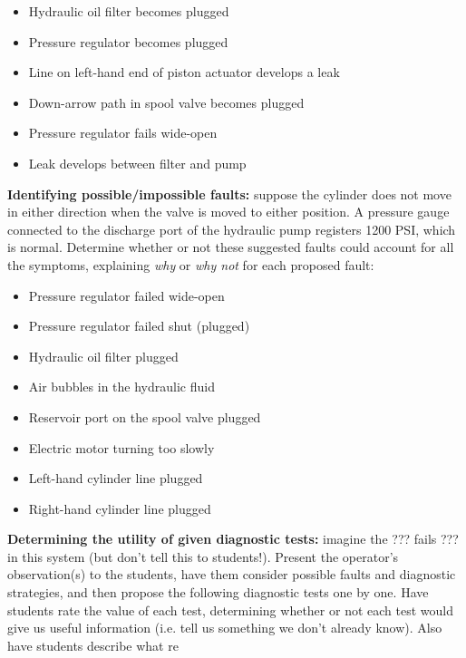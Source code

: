 \begin{itemize}
\item{} Hydraulic oil filter becomes plugged
\item{} Pressure regulator becomes plugged
\item{} Line on left-hand end of piston actuator develops a leak
\item{} Down-arrow path in spool valve becomes plugged
\item{} Pressure regulator fails wide-open
\item{} Leak develops between filter and pump
\end{itemize}


\vskip 10pt


\noindent
{\bf Identifying possible/impossible faults:} suppose the cylinder does not move in either direction when the valve is moved to either position.  A pressure gauge connected to the discharge port of the hydraulic pump registers 1200 PSI, which is normal.  Determine whether or not these suggested faults could account for all the symptoms, explaining {\it why} or {\it why not} for each proposed fault:

\begin{itemize}
\item{} Pressure regulator failed wide-open
\item{} Pressure regulator failed shut (plugged)
\item{} Hydraulic oil filter plugged
\item{} Air bubbles in the hydraulic fluid
\item{} Reservoir port on the spool valve plugged
\item{} Electric motor turning too slowly
\item{} Left-hand cylinder line plugged
\item{} Right-hand cylinder line plugged
\end{itemize}


\vskip 10pt


\noindent
{\bf Determining the utility of given diagnostic tests:} imagine the ??? fails ??? in this system (but don't tell this to students!).  Present the operator's observation(s) to the students, have them consider possible faults and diagnostic strategies, and then propose the following diagnostic tests one by one.  Have students rate the value of each test, determining whether or not each test would give us useful information (i.e. tell us something we don't already know).  Also have students describe what re

